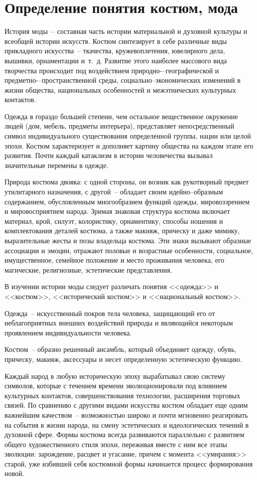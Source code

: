   \section{Определение понятия костюм, мода}
    
  История моды~-- составная часть истории материальной и духовной культуры и
  всеобщей истории искусств. Костюм синтезирует в себе различные виды
  прикладного искусства~-- ткачества, кружевоплетения, ювелирного дела,
  вышивки, орнаментации и~т.~д. Развитие этого наиболее массового вида
  творчества происходит под воздействием природно-–географической и
  предметно-–пространственной среды, социально--экономических изменений в
  жизни общества, национальных особенностей и межэтнических культурных
  контактов.

  Одежда в гораздо большей степени, чем остальное вещественное окружение людей
  (дом, мебель, предметы интерьера), представляет непосредственный символ
  индивидуального существования определенной группы, нации или целой эпохи.
  Костюм характеризует и дополняет картину общества на каждом этапе его
  развития. Почти каждый катаклизм в истории человечества вызывал значительные
  перемены в одежде.
  
  Природа костюма двояка: с одной стороны, он возник как рукотворный предмет
  утилитарного назначения, с другой~-- обладает своим идейно--образным
  содержанием, обусловленным многообразием функций одежды, мировоззрением и
  мировосприятием народа. Зримая знаковая структура костюма включает материал,
  крой, силуэт, колористику, орнаментику, способы ношения и комплектования
  деталей костюма, а также макияж, прическу и даже мимику, выразительные жесты
  и позы владельца костюма. Эти знаки вызывают образные ассоциации и эмоции,
  отражают половые и возрастные особенности, социальное, имущественное,
  семейное положение и место проживания человека, его магические, религиозные,
  эстетические представления.
 
  В изучении истории моды следует различать понятия <<одежда>> и <<костюм>>,
  <<исторический костюм>> и <<национальный костюм>>.
  
  Одежда~-- искусственный покров тела человека, защищающий его от
  неблагоприятных внешних воздействий природы и являющийся некоторым
  проявлением индивидуальности человека.
  
  Костюм~-- образно решенный ансамбль, который объединяет одежду, обувь,
  прическу, макияж, аксессуары и несет определенную эстетическую функцию.
  
  Каждый народ в любую историческую эпоху вырабатывал свою систему символов,
  которые с течением времени эволюционировали под влиянием культурных
  контактов, совершенствования технологии, расширения торговых связей. По
  сравнению с другими видами искусства костюм обладает еще одним важнейшим
  качеством~-- возможностью широко и почти мгновенно реагировать на события в
  жизни народа, на смену эстетических и идеологических течений в духовной
  сфере. Формы костюма всегда развиваются параллельно с развитием общего
  художественного стиля эпохи, переживая вместе с ним все этапы эволюции:
  зарождение, расцвет и угасание, причем с момента <<умирания>> старой, уже
  избившей себя костюмной формы начинается процесс формирования новой.
  
